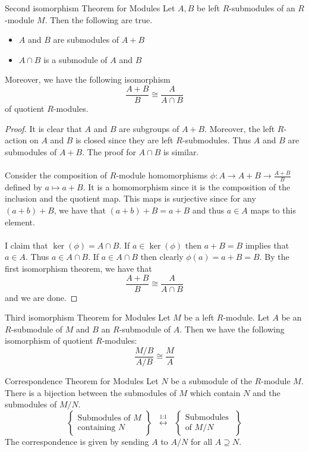 \documentclass[a4paper]{article}
\begin{document}
\begin{thm}{Second isomorphism Theorem for Modules}{} Let $A,B$ be left $R$-submodules of an $R$-module $M$. Then the following are true. 
\begin{itemize}
\item $A$ and $B$ are submodules of $A+B$
\item $A\cap B$ is a submodule of $A$ and $B$
\end{itemize}
Moreover, we have the following isomorphism $$\frac{A+B}{B}\cong\frac{A}{A\cap B}$$ of quotient $R$-modules. \tcbline
\begin{proof}
It is clear that $A$ and $B$ are subgroups of $A+B$. Moreover, the left $R$-action on $A$ and $B$ is closed since they are left $R$-submodules. Thus $A$ and $B$ are submodules of $A+B$. The proof for $A\cap B$ is similar. \\~\\

Consider the composition of $R$-module homomorphisms $\phi:A\to A+B\to\frac{A+B}{B}$ defined by $a\mapsto a+B$. It is a homomorphism since it is the composition of the inclusion and the quotient map. This maps is surjective since for any $(a+b)+B$, we have that $(a+b)+B=a+B$ and thus $a\in A$ maps to this element. \\~\\
I claim that $\ker(\phi)=A\cap B$. If $a\in\ker(\phi)$ then $a+B=B$ implies that $a\in A$. Thus $a\in A\cap B$. If $a\in A\cap B$ then clearly $\phi(a)=a+B=B$. By the first isomorphism theorem, we have that $$\frac{A+B}{B}\cong\frac{A}{A\cap B}$$ and we are done. 
\end{proof}
\end{thm}

\begin{thm}{Third isomorphism Theorem for Modules}{} Let $M$ be a left $R$-module. Let $A$ be an $R$-submodule of $M$ and $B$ an $R$-submodule of $A$. Then we have the following isomorphism of quotient $R$-modules: $$\frac{M/B}{A/B}\cong\frac{M}{A}$$
\end{thm}

\begin{thm}{Correspondence Theorem for Modules}{} Let $N$ be a submodule of the $R$-module $M$. There is a bijection between the submodules of $M$ which contain $N$ and the submodules of $M/N$. $$\left\{\substack{\text{Submodules of }M\\\text{containing }N}\right\}\;\;\overset{\text{1:1}}{\longleftrightarrow}\;\;\left\{\substack{\text{Submodules }\\\text{of }M/N}\right\}$$ The correspondence is given by sending $A$ to $A/N$ for all $A\supseteq N$. 
\end{thm}
\end{document}
